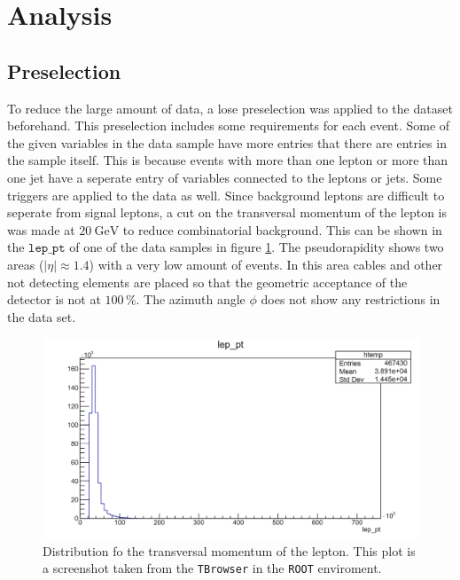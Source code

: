 \section{Analysis}
\subsection{Preselection}
To reduce the large amount of data, a lose preselection was applied to the dataset beforehand.
This preselection includes some requirements for each event.
Some of the given variables in the data sample have more entries that there are entries in the sample itself.
This is because events with more than one lepton or more than one jet have a seperate entry of variables connected to the leptons or jets.
Some triggers are applied to the data as well.
Since background leptons are difficult to seperate from signal leptons, a cut on the transversal momentum of the lepton is was made at $\SI{20}{\giga\electronvolt}$ to reduce combinatorial background.
This can be shown in the $\texttt{lep$\_$pt}$ of one of the data samples in figure \ref{fig:leppt}.
The pseudorapidity shows two areas ($|\eta|\approx 1.4$) with a very low amount of events.
In this area cables and other not detecting elements are placed so that the geometric acceptance of the detector is not at $100\,\%$.
The azimuth angle $\phi$ does not show any restrictions in the data set.

\begin{figure}[H]
    \centering
    \includegraphics[width=\linewidth]{plots/TB_lep_pt.png}
    \caption{Distribution fo the transversal momentum of the lepton. This plot is a screenshot taken from the \texttt{TBrowser} in the \texttt{ROOT} enviroment. }
    \label{fig:leppt}
\end{figure}









